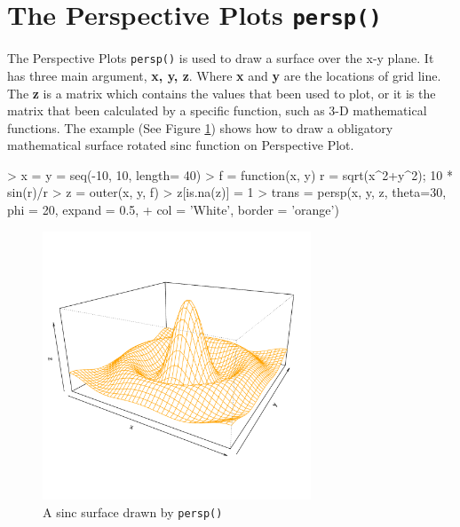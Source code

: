\documentclass[paper=a4, fontsize=11pt]{report}
\begin{document}
\section{The Perspective Plots \texttt{persp()}}
The Perspective Plots \texttt{persp()} is used to draw a surface over the x-y plane.  
It has three main argument, \textbf{x, y, z}. Where \textbf{x} and \textbf{y} are the locations of grid line. The \textbf{z} is a matrix which contains the values that been used to plot, or it is the matrix that been calculated by a specific function, such as 3-D mathematical functions. The example (See Figure \ref{figure_3.1}) shows how to draw a obligatory mathematical surface rotated sinc function on Perspective Plot.
\begin{Schunk}
\begin{Sinput}
> x = y = seq(-10, 10, length= 40)
> f = function(x, y) { r = sqrt(x^2+y^2); 10 * sin(r)/r }
> z = outer(x, y, f)
> z[is.na(z)] = 1
> trans = persp(x, y, z, theta=30, phi = 20, expand = 0.5,
+               col = 'White', border = 'orange')
\end{Sinput}
\end{Schunk}
\begin{figure}[h!]
	\begin{center}
		\includegraphics[height = 8cm, width = 8cm]{figure/standalone_1.pdf}
		\caption{A sinc surface drawn by \texttt{persp()}}
		\label{figure_3.1}
	\end{center}
\end{figure}
\end{document}
